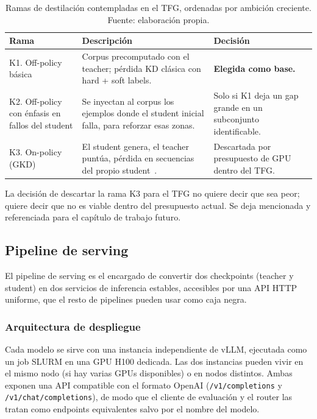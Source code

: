 \begin{table}[H]
\centering
\caption{Ramas de destilación contempladas en el TFG, ordenadas por ambición creciente. Fuente: elaboración propia.}
\label{tab:ramas-kd}
\footnotesize
\begin{tabularx}{\textwidth}{>{\raggedright\arraybackslash}p{3.5cm} >{\raggedright\arraybackslash}X >{\raggedright\arraybackslash}p{3.2cm}}
\toprule
\textbf{Rama} & \textbf{Descripción} & \textbf{Decisión} \\
\midrule
K1. Off-policy básica & Corpus precomputado con el teacher; pérdida KD clásica con hard + soft labels. & \textbf{Elegida como base.} \\
\addlinespace
K2. Off-policy con énfasis en fallos del student & Se inyectan al corpus los ejemplos donde el student inicial falla, para reforzar esas zonas. & Solo si K1 deja un gap grande en un subconjunto identificable. \\
\addlinespace
K3. On-policy (GKD) & El student genera, el teacher puntúa, pérdida en secuencias del propio student~\cite{agarwal2024gkd}. & Descartada por presupuesto de GPU dentro del TFG. \\
\bottomrule
\end{tabularx}
\end{table}

La decisión de descartar la rama K3 para el TFG no quiere decir que sea peor; quiere decir que no es viable dentro del presupuesto actual. Se deja mencionada y referenciada para el capítulo de trabajo futuro.

\subsection{Pipeline de serving}

El pipeline de serving es el encargado de convertir dos checkpoints (teacher y student) en dos servicios de inferencia estables, accesibles por una API HTTP uniforme, que el resto de pipelines pueden usar como caja negra.

\subsubsection{Arquitectura de despliegue}

Cada modelo se sirve con una instancia independiente de vLLM, ejecutada como un job SLURM en una GPU H100 dedicada. Las dos instancias pueden vivir en el mismo nodo (si hay varias GPUs disponibles) o en nodos distintos. Ambas exponen una API compatible con el formato OpenAI (\texttt{/v1/completions} y \texttt{/v1/chat/completions}), de modo que el cliente de evaluación y el router las tratan como endpoints equivalentes salvo por el nombre del modelo.

